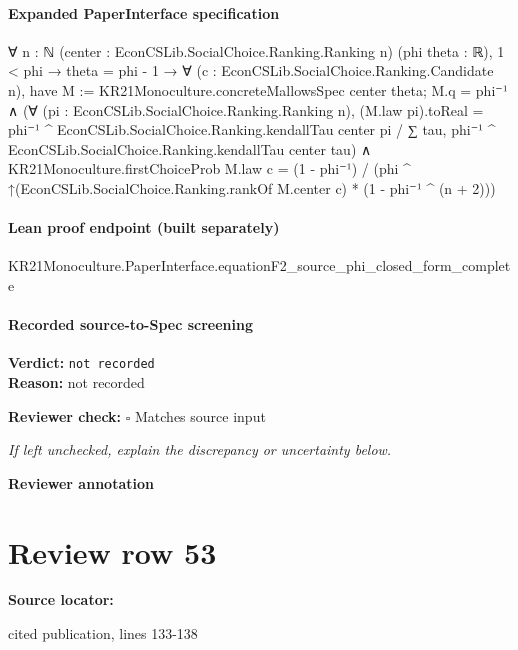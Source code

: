 \documentclass[10pt]{article}
\newcommand{\reviewerbox}{%
  \par\noindent\fbox{\parbox{0.96\linewidth}{\rule{0pt}{0.38in}}}\par
}
\newcommand{\reviewmatch}[1]{%
  \par\noindent\textbf{Reviewer check:} $\square$\; #1\par
  \noindent\emph{If left unchecked, explain the discrepancy or uncertainty below.}\par
}
\begin{document}
\paragraph{Expanded PaperInterface specification}
\begin{ReviewVerbatim}
∀ {n : ℕ} (center : EconCSLib.SocialChoice.Ranking.Ranking n) (phi theta : ℝ),
  1 < phi →
    theta = phi - 1 →
      ∀ (c : EconCSLib.SocialChoice.Ranking.Candidate n),
        have M := KR21Monoculture.concreteMallowsSpec center theta;
        M.q = phi⁻¹ ∧
          (∀ (pi : EconCSLib.SocialChoice.Ranking.Ranking n),
              (M.law pi).toReal =
                phi⁻¹ ^ EconCSLib.SocialChoice.Ranking.kendallTau center pi /
                  ∑ tau, phi⁻¹ ^ EconCSLib.SocialChoice.Ranking.kendallTau center tau) ∧
            KR21Monoculture.firstChoiceProb M.law c =
              (1 - phi⁻¹) / (phi ^ ↑(EconCSLib.SocialChoice.Ranking.rankOf M.center c) * (1 - phi⁻¹ ^ (n + 2)))
\end{ReviewVerbatim}

\paragraph{Lean proof endpoint (built separately)}\begin{ReviewVerbatim}
KR21Monoculture.PaperInterface.equationF2_source_phi_closed_form_complete
\end{ReviewVerbatim}

\paragraph{Recorded source-to-Spec screening}
\textbf{Verdict:} \texttt{not recorded}
\\
\textbf{Reason:} not recorded
\reviewmatch{Matches source input}
\noindent\textbf{Reviewer annotation}\par
\reviewerbox
\clearpage
\hypertarget{source-claim-1e4808a386b72297}{}
\section*{Review row 53}
\textbf{Source locator:} {\footnotesize\raggedright cited publication, lines 133-\allowbreak{}138\par}
\end{document}
